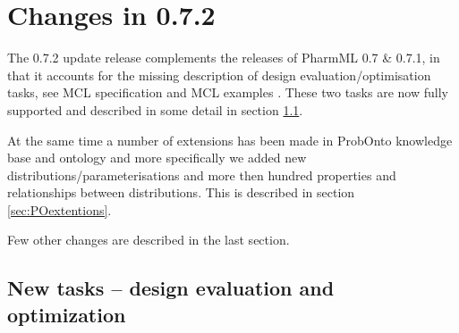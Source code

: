 
\chapter{Changes in 0.7.2}
\label{ch:072changes}
The 0.7.2 update release complements the releases of PharmML 0.7 \& 0.7.1,
in that it accounts for the missing description of design evaluation/optimisation tasks, see 
MCL specification \cite{Commets2015} and MCL examples \cite{CommetsExamples2015}.
These two tasks are now fully supported and described in some detail in section 
\ref{sec:newDesignTasks}.

At the same time a number of extensions has been made in ProbOnto knowledge 
base and ontology and more specifically we added new distributions/parameterisations 
and more then hundred properties and relationships between distributions. This is described 
in section \ref{sec:POextentions}. 

Few other changes are described in the last section. 


\section{New tasks -- design evaluation and optimization}
\label{sec:newDesignTasks}

